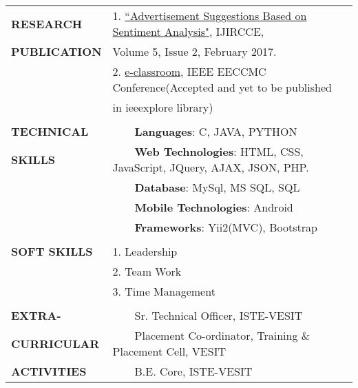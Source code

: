 \documentclass[letterpaper,11pt,oneside]{article}
\newcommand{\tabitem}{~~\llap{\textbullet}~~}
\begin{document}
	\newpage
	
	
	\noindent \begin{tabular}{@{} l l}
		\textbf{RESEARCH}    &1. \href{http://www.ijircce.com/upload/2017/february/44_6_Advertisement.pdf}{``Advertisement Suggestions Based on Sentiment Analysis"}, IJIRCCE,\\ 	
		\textbf{PUBLICATION}    & \hspace{0.3cm} Volume 5, Issue 2, February 2017. \\ 
		&2. \href{http://eeccmc.org/acceptance.php}{e-classroom},  IEEE EECCMC Conference(Accepted and yet to be published \\ & \hspace{0.3cm} in ieeexplore library)
		\\
		& \\
		\textbf{TECHNICAL}    & \tabitem \textbf{Languages}: C, JAVA, PYTHON\\
		\textbf{SKILLS}    & \tabitem \textbf{Web Technologies}: HTML, CSS, JavaScript, JQuery, AJAX, JSON, PHP. \\
		&\tabitem \textbf{Database}: MySql, MS SQL, SQL\\
		&\tabitem \textbf{Mobile Technologies}: Android\\
		&\tabitem \textbf{Frameworks}: Yii2(MVC), Bootstrap\\
		& \\
		\textbf{SOFT SKILLS}    &1. Leadership\\ 	 &2. Team Work \\ 
		&3. Time Management
		\\
		& \\
		\textbf{EXTRA-}    & \tabitem Sr. Technical Officer, ISTE-VESIT\\
		\textbf{CURRICULAR}    & \tabitem Placement Co-ordinator, Training \& Placement Cell, VESIT\\
		\textbf{ACTIVITIES}    & \tabitem B.E. Core, ISTE-VESIT \\
		
	\end{tabular}
	
\end{document}
